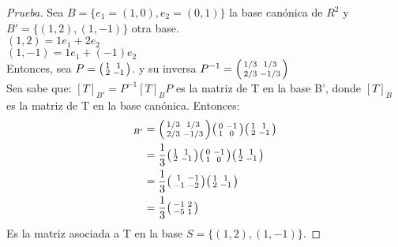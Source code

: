 \documentclass[12pt]{article}
\newenvironment{xmat}
  {\left(\begin{smallmatrix}}
  {\end{smallmatrix}\right)}
\begin{document}
\begin{proof} [Prueba]
Sea $B=\{e_{1}=(1,0), e_{2}=(0,1)\}$ la base canónica de $R^{2}$ y $B'=\{(1,2), (1,-1)\}$ otra base.\\
$(1,2) = 1e_{1} + 2e_{2}$\\
$(1,-1) = 1e_{1} + (-1)e_{2}$\\
Entonces, sea $P=\begin{xmat}1 & 1\\2 & -1\end{xmat}$. y su inversa $P^{-1}=\begin{xmat}1/3 & 1/3\\2/3 & -1/3\end{xmat}$\\
Sea sabe que: $[T]_{B'}=P^{-1}[T]_{B}P$ es la matriz de T en la base B', donde $[T]_{B}$ es la matriz de T en la base canónica. Entonces:
\begin{align*}
[T]_{B'} & =\begin{xmat}1/3 & 1/3\\2/3 & -1/3\end{xmat}\begin{xmat}0 & -1\\1 & 0\end{xmat}\begin{xmat}1 & 1\\2 & -1\end{xmat}\\
& = \frac{1}{3}\begin{xmat}1 & 1\\2 & -1\end{xmat}\begin{xmat}0 & -1\\1 & 0\end{xmat}\begin{xmat}1 & 1\\2 & -1\end{xmat}\\
& = \frac{1}{3}\begin{xmat}1 & -1\\-1 & -2\end{xmat}\begin{xmat}1 & 1\\2 & -1\end{xmat}\\
& = \frac{1}{3}\begin{xmat}-1 & 2\\-5 & 1\end{xmat}
\end{align*}
Es la matriz asociada a T en la base $S=\{(1,2), (1,-1)\}$.
\end{proof} 
\end{document}
